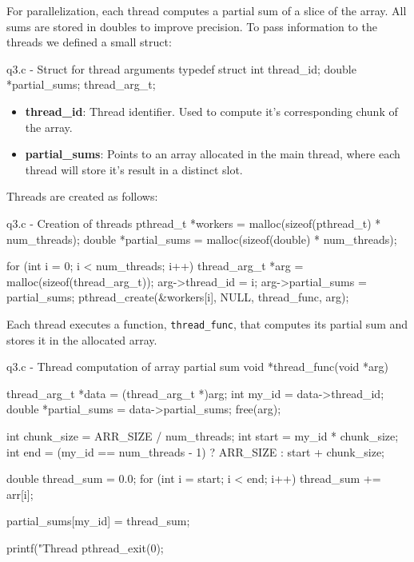 \documentclass[../main.tex]{subfiles}
\begin{document}
For parallelization, each thread computes a partial sum of a slice of the array. All sums are stored in doubles to improve precision. To pass information to the threads we defined a small struct:

\begin{cppcode}{q3.c - Struct for thread arguments}
typedef struct{
    int thread_id;
    double *partial_sums;
} thread_arg_t;
\end{cppcode}

\begin{itemize}
    \item \textbf{thread\_id}: Thread identifier. Used to compute it's corresponding chunk of the array.
    \item \textbf{partial\_sums}: Points to an array allocated in the main thread, where each thread will store it's result in a distinct slot.
\end{itemize}

Threads are created as follows:

\begin{cppcode}{q3.c - Creation of threads}
pthread_t *workers = malloc(sizeof(pthread_t) * num_threads);
double *partial_sums = malloc(sizeof(double) * num_threads);

for (int i = 0; i < num_threads; i++)
{
    thread_arg_t *arg = malloc(sizeof(thread_arg_t));
    arg->thread_id = i;
    arg->partial_sums = partial_sums;
    pthread_create(&workers[i], NULL, thread_func, arg); 
}
\end{cppcode}

Each thread executes a function, \lstinline{thread_func}, that computes its partial sum and stores it in the allocated array.

\begin{cppcode}{q3.c - Thread computation of array partial sum}
void *thread_func(void *arg) { 
    thread_arg_t *data = (thread_arg_t *)arg;
    int my_id = data->thread_id;
    double *partial_sums = data->partial_sums;
    free(arg);

    int chunk_size = ARR_SIZE / num_threads;
    int start = my_id * chunk_size;
    int end = (my_id == num_threads - 1) ? ARR_SIZE : start + chunk_size;

    double thread_sum = 0.0;
    for (int i = start; i < end; i++)
        thread_sum += arr[i];

    partial_sums[my_id] = thread_sum;

    printf("Thread %
    pthread_exit(0);
}
\end{cppcode}
\end{document}
